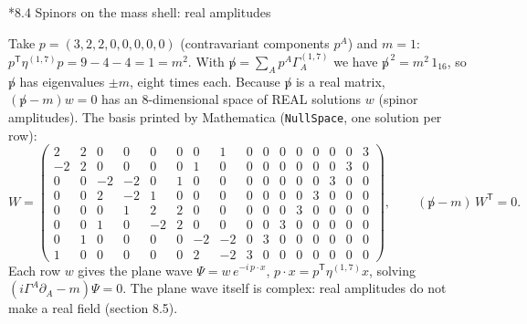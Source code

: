 \documentclass[10pt,a4paper]{article}
\makeatletter
\renewcommand\subsection{\@startsection{subsection}{2}{\z@}{-3.25ex\@plus -1ex \@minus -.2ex}{1.5ex \@plus .2ex}{\normalfont\large\bfseries\raggedright}}
\makeatother
\begin{document}
\subsection*{8.4 Spinors on the mass shell: real amplitudes}
Take $p=(3,2,2,0,0,0,0,0)$ (contravariant components $p^A$) and $m=1$: $p^{\mathsf T}\eta^{(1,7)}p=9-4-4=1=m^2$. With $\not p=\sum_Ap^A\Gamma^{(1,7)}_A$ we have $\not p^{\,2}=m^2\,1_{16}$, so $\not p$ has eigenvalues $\pm m$, eight times each. Because $\not p$ is a real matrix, $(\not p-m)w=0$ has an 8-dimensional space of REAL solutions $w$ (spinor amplitudes). The basis printed by Mathematica (\texttt{NullSpace}, one solution per row):
\begin{equation*}
W=\begin{pmatrix}2 & 2 & 0 & 0 & 0 & 0 & 0 & 1 & 0 & 0 & 0 & 0 & 0 & 0 & 0 & 3 \\ -2 & 2 & 0 & 0 & 0 & 0 & 1 & 0 & 0 & 0 & 0 & 0 & 0 & 0 & 3 & 0 \\ 0 & 0 & -2 & -2 & 0 & 1 & 0 & 0 & 0 & 0 & 0 & 0 & 0 & 3 & 0 & 0 \\ 0 & 0 & 2 & -2 & 1 & 0 & 0 & 0 & 0 & 0 & 0 & 0 & 3 & 0 & 0 & 0 \\ 0 & 0 & 0 & 1 & 2 & 2 & 0 & 0 & 0 & 0 & 0 & 3 & 0 & 0 & 0 & 0 \\ 0 & 0 & 1 & 0 & -2 & 2 & 0 & 0 & 0 & 0 & 3 & 0 & 0 & 0 & 0 & 0 \\ 0 & 1 & 0 & 0 & 0 & 0 & -2 & -2 & 0 & 3 & 0 & 0 & 0 & 0 & 0 & 0 \\ 1 & 0 & 0 & 0 & 0 & 0 & 2 & -2 & 3 & 0 & 0 & 0 & 0 & 0 & 0 & 0\end{pmatrix},\qquad (\not p-m)\,W^{\mathsf T}=0 .
\end{equation*}
Each row $w$ gives the plane wave $\Psi=w\,e^{-i\,p\cdot x}$, $p\cdot x=p^{\mathsf T}\eta^{(1,7)}x$, solving $(i\Gamma^{A}\partial_A-m)\Psi=0$. The plane wave itself is complex: real amplitudes do not make a real field (section 8.5).
\end{document}
